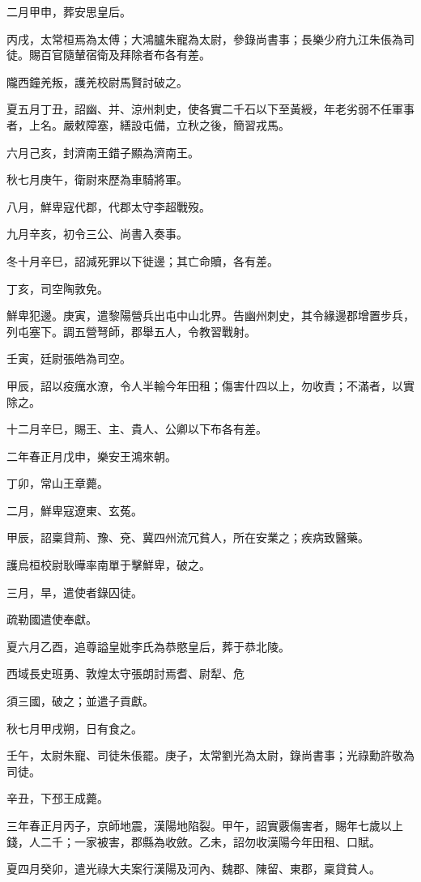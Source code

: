 \begin{pinyinscope}
二月甲申，葬安思皇后。

丙戌，太常桓焉為太傅；大鴻臚朱寵為太尉，參錄尚書事；長樂少府九江朱倀為司徒。賜百官隨輦宿衛及拜除者布各有差。

隴西鐘羌叛，護羌校尉馬賢討破之。

夏五月丁丑，詔幽、并、涼州刺史，使各實二千石以下至黃綬，年老劣弱不任軍事者，上名。嚴敕障塞，繕設屯備，立秋之後，簡習戎馬。

六月己亥，封濟南王錯子顯為濟南王。

秋七月庚午，衛尉來歷為車騎將軍。

八月，鮮卑寇代郡，代郡太守李超戰歿。

九月辛亥，初令三公、尚書入奏事。

冬十月辛巳，詔減死罪以下徙邊；其亡命贖，各有差。

丁亥，司空陶敦免。

鮮卑犯邊。庚寅，遣黎陽營兵出屯中山北界。告幽州刺史，其令緣邊郡增置步兵，列屯塞下。調五營弩師，郡舉五人，令教習戰射。

壬寅，廷尉張皓為司空。

甲辰，詔以疫癘水潦，令人半輸今年田租；傷害什四以上，勿收責；不滿者，以實除之。

十二月辛巳，賜王、主、貴人、公卿以下布各有差。

二年春正月戊申，樂安王鴻來朝。

丁卯，常山王章薨。

二月，鮮卑寇遼東、玄菟。

甲辰，詔稟貸荊、豫、兗、冀四州流冗貧人，所在安業之；疾病致醫藥。

護烏桓校尉耿曄率南單于擊鮮卑，破之。

三月，旱，遣使者錄囚徒。

疏勒國遣使奉獻。

夏六月乙酉，追尊謚皇妣李氏為恭愍皇后，葬于恭北陵。

西域長史班勇、敦煌太守張朗討焉耆、尉犁、危

須三國，破之；並遣子貢獻。

秋七月甲戌朔，日有食之。

壬午，太尉朱寵、司徒朱倀罷。庚子，太常劉光為太尉，錄尚書事；光祿勳許敬為司徒。

辛丑，下邳王成薨。

三年春正月丙子，京師地震，漢陽地陷裂。甲午，詔實覈傷害者，賜年七歲以上錢，人二千；一家被害，郡縣為收斂。乙未，詔勿收漢陽今年田租、口賦。

夏四月癸卯，遣光祿大夫案行漢陽及河內、魏郡、陳留、東郡，稟貸貧人。


\end{pinyinscope}
